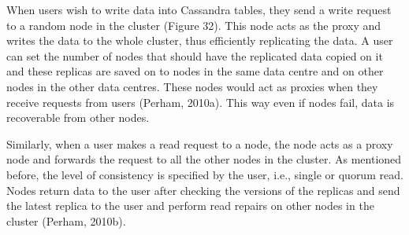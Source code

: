 When users wish to write data into Cassandra tables, they send a write request
to a random node in the cluster (Figure 32). This node acts as the proxy and
writes the data to the whole cluster, thus efficiently replicating the data.
A user can set the number of nodes that should have the
replicated data copied on it and these replicas are saved on to nodes in the
same data centre and on other nodes in the other data centres. These nodes would act
as proxies when they receive requests from users (Perham, 2010a). This way even
if nodes fail, data is recoverable from other nodes.

Similarly, when a user makes a read request to a node, the node acts as a proxy
node and forwards the request to all the other nodes in the cluster. As
mentioned before, the level of consistency is specified by the user, i.e.,
single or quorum read. Nodes return data to the user after checking the versions
of the replicas and send the latest replica to the user and perform read repairs
on other nodes in the cluster (Perham, 2010b).